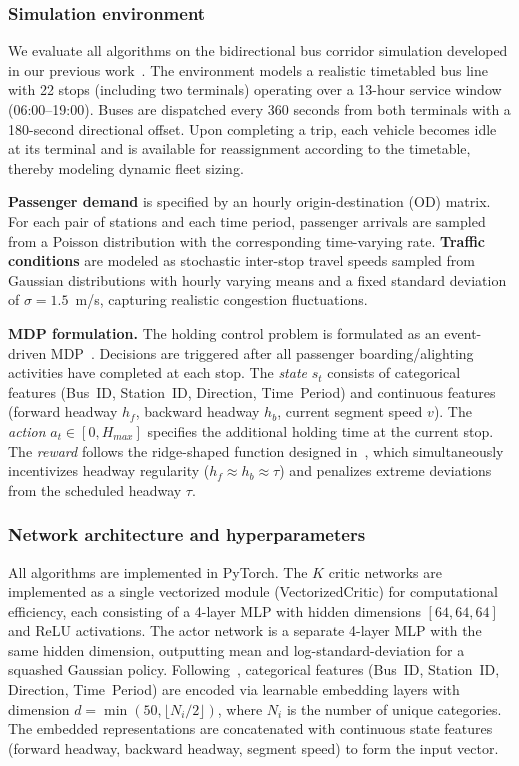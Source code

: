 \documentclass[10pt]{article}
\begin{document}
\subsubsection{Simulation environment}
We evaluate all algorithms on the bidirectional bus corridor simulation developed in our previous work~\cite{Zhang2025SingleAgentBus}. The environment models a realistic timetabled bus line with 22 stops (including two terminals) operating over a 13-hour service window (06:00--19:00). Buses are dispatched every 360 seconds from both terminals with a 180-second directional offset. Upon completing a trip, each vehicle becomes idle at its terminal and is available for reassignment according to the timetable, thereby modeling dynamic fleet sizing.

\textbf{Passenger demand} is specified by an hourly origin-destination (OD) matrix. For each pair of stations and each time period, passenger arrivals are sampled from a Poisson distribution with the corresponding time-varying rate. \textbf{Traffic conditions} are modeled as stochastic inter-stop travel speeds sampled from Gaussian distributions with hourly varying means and a fixed standard deviation of $\sigma = 1.5$~m/s, capturing realistic congestion fluctuations.

\textbf{MDP formulation.} The holding control problem is formulated as an event-driven MDP~\cite{Zhang2025SingleAgentBus}. Decisions are triggered after all passenger boarding/alighting activities have completed at each stop. The \textit{state} $s_t$ consists of categorical features (Bus~ID, Station~ID, Direction, Time~Period) and continuous features (forward headway $h_f$, backward headway $h_b$, current segment speed $v$). The \textit{action} $a_t \in [0, H_{max}]$ specifies the additional holding time at the current stop. The \textit{reward} follows the ridge-shaped function designed in~\cite{Zhang2025SingleAgentBus}, which simultaneously incentivizes headway regularity ($h_f \approx h_b \approx \tau$) and penalizes extreme deviations from the scheduled headway $\tau$.

\subsubsection{Network architecture and hyperparameters}
All algorithms are implemented in PyTorch. The $K$ critic networks are implemented as a single vectorized module (VectorizedCritic) for computational efficiency, each consisting of a 4-layer MLP with hidden dimensions $[64, 64, 64]$ and ReLU activations. The actor network is a separate 4-layer MLP with the same hidden dimension, outputting mean and log-standard-deviation for a squashed Gaussian policy. Following~\cite{Zhang2025SingleAgentBus}, categorical features (Bus~ID, Station~ID, Direction, Time~Period) are encoded via learnable embedding layers with dimension $d = \min(50, \lfloor N_i / 2 \rfloor)$, where $N_i$ is the number of unique categories. The embedded representations are concatenated with continuous state features (forward headway, backward headway, segment speed) to form the input vector.
\end{document}
